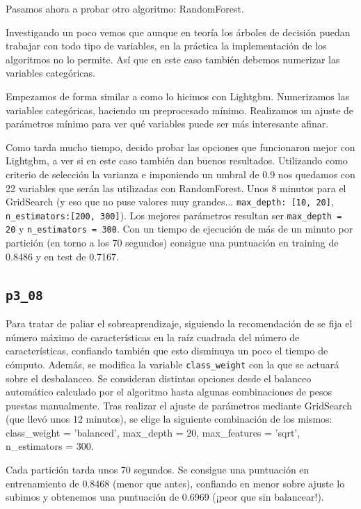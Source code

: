 \documentclass[a4paper, 20pt]{article}
\begin{document}
Pasamos ahora a probar otro algoritmo: RandomForest.

Investigando un poco vemos que aunque en teoría los árboles de decisión puedan trabajar con todo tipo de variables, en la práctica la implementación de los algoritmos no lo permite. Así que en este caso también debemos numerizar las variables categóricas.

Empezamos de forma similar a como lo hicimos con Lightgbm. Numerizamos las variables categóricas, haciendo un preprocesado mínimo. Realizamos un ajuste de parámetros mínimo para ver qué variables puede ser más interesante afinar.

Como tarda mucho tiempo, decido probar las opciones que funcionaron mejor con Lightgbm, a ver si en este caso también dan buenos resultados. Utilizando como criterio de selección la varianza e imponiendo un umbral de 0.9 nos quedamos con 22 variables que serán las utilizadas con RandomForest. Unos 8 minutos para el GridSearch (y eso que no puse valores muy grandes... \texttt{max\_depth: [10, 20]}, \texttt{n\_estimators:[200, 300]}). Los mejores parámetros resultan ser \texttt{max\_depth = 20} y \texttt{n\_estimators = 300}.
Con un tiempo de ejecución de más de un minuto por partición (en torno a los 70 segundos) consigue una puntuación en training de 0.8486 y en test de 0.7167.

\subsection{\texttt{p3\_08}}

Para tratar de paliar el sobreaprendizaje, siguiendo la recomendación de %
se fija el número máximo de características en la raíz cuadrada del número de características, confiando también que esto disminuya un poco el tiempo de cómputo. Además, se modifica la variable \texttt{class\_weight} con la que se actuará sobre el desbalanceo. Se consideran distintas opciones desde el balanceo automático calculado por el algoritmo hasta algunas combinaciones de pesos puestas manualmente. Tras realizar el ajuste de parámetros mediante GridSearch (que llevó unos 12 minutos), se elige la siguiente combinación de los mismos: {\ttfamily class\_weight = 'balanced', max\_depth = 20, max\_features = 'sqrt', n\_estimators = 300}.

Cada partición tarda unos 70 segundos. Se consigue una puntuación en entrenamiento de 0.8468 (menor que antes), confiando en menor sobre ajuste lo subimos y obtenemos una puntuación de 0.6969 (¡peor que sin balancear!).
\end{document}
